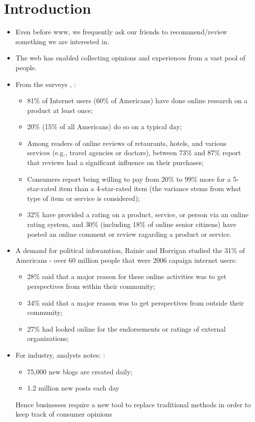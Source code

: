 \documentclass{article}
\begin{document}
\chapter{Introduction}
  \begin{itemize}
    \item Even before www, we frequently ask our friends to recommend/review
something we are interested in.
    \item The web has enabled collecting opinions and experiences from a vast
pool of people.
    \item From the surveys \citet{comScore2007}, \citet{Horrigan2008}:
      \begin{itemize}
        \item 81\% of Internet users (60\% of Americans) have done online 
research on a product at least once;
        \item 20\% (15\% of all Americans) do so on a typical day;
        \item Among readers of online reviews of retaurants, hotels, and various
services (e.g., travel agencies or doctors), between 73\% and 87\% report
that reviews had a significant influence on their purchases;
        \item Consumers report being willing to pay from 20\% to 99\% more for
a 5-star-rated item than a 4-star-rated item (the variance stems from what
type of item or service is considered);
        \item 32\% have provided a rating on a product, service, or person via
an online rating system, and 30\% (including 18\% of online senior citizens) 
have posted an online comment or review ragarding a product or service.
      \end{itemize}
    \item A demand for political inforamtion, Rainie and Horrigan
\citet{Rainie2007} studied the 31\% of Americans - over 60 million people that
were 2006 capaign internet users:  
      \begin{itemize}
        \item 28\% said that a major reason for these online activities was to
get perspectives from within their community;
        \item 34\% said that a major reason was to get perspectives from
outside their community;
        \item 27\% had looked online for the endorsements or ratings of
external organizations;
      \end{itemize}

    \item For industry, analysts notes:
\citet{ForrestWave2006}:
      \begin{itemize}
        \item 75,000 new blogs are created daily;
        \item 1.2 million new posts each day
      \end{itemize}
       Hence businesses require a new tool to replace traditional methods in
order to keep track of consumer opinions
  \end{itemize}
\end{document}
